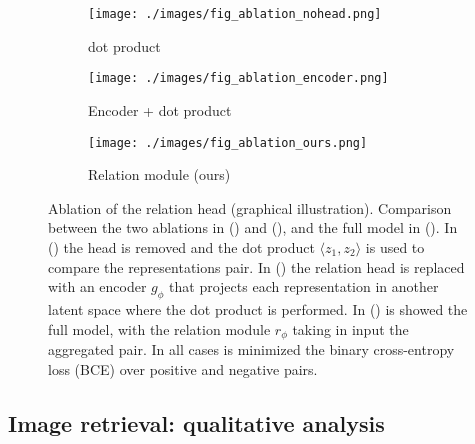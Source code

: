 \documentclass{article}
\begin{document}
\begin{figure}[H]
    \centering
    \begin{subfigure}[t]{0.30\textwidth}
       \centering
        \texttt{[image: ./images/fig\_ablation\_nohead.png]}
        \caption{dot product}
        \label{fig:ablation-nohead}
    \end{subfigure}
    \begin{subfigure}[t]{0.30\textwidth}
       \centering
        \texttt{[image: ./images/fig\_ablation\_encoder.png]}
        \caption{Encoder + dot product}
        \label{fig:ablation-encoder}
    \end{subfigure}
    \begin{subfigure}[t]{0.30\textwidth}
       \centering
        \texttt{[image: ./images/fig\_ablation\_ours.png]}
        \caption{Relation module (ours)}
        \label{fig:ablation-ours}
    \end{subfigure}
    \caption{Ablation of the relation head (graphical illustration). Comparison between the two ablations in () and (), and the full model in (). In () the head is removed and the dot product $\langle z_{1}, z_{2} \rangle$ is used to compare the representations pair. In () the relation head is replaced with an encoder $g_{\phi}$ that projects each representation in another latent space where the dot product is performed. In () is showed the full model, with the relation module $r_{\phi}$ taking in input the aggregated pair. In all cases is minimized the binary cross-entropy loss (BCE) over positive and negative pairs.}
    \label{fig:ablation}
\end{figure}

\subsection{Image retrieval: qualitative analysis}\label{appendix:additional_retrieval}
\FloatBarrier
\end{document}
